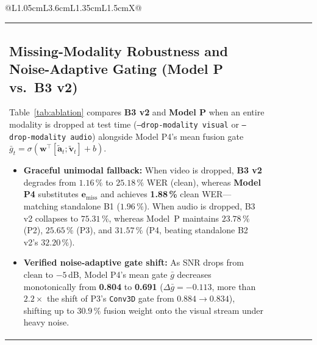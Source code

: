 \documentclass[11pt,a4paper]{article}
\newcommand{\code}[1]{\texttt{\small #1}}
\begin{document}
\begin{table}[htbp]
\begin{tabularx}{\textwidth}{@{}L{1.05cm}L{3.6cm}L{1.35cm}L{1.5cm}X@{}}
\begin{table}[htbp]
\begin{tabularx}{\textwidth}{@{}lccccc@{}}
\subsection{Missing-Modality Robustness and Noise-Adaptive Gating (Model P vs.\ B3 v2)}
Table~\ref{tab:ablation} compares \textbf{B3 v2} and \textbf{Model P} when an entire modality is dropped at test time (\code{--drop-modality visual} or \code{--drop-modality audio}) alongside Model P4's mean fusion gate $\bar{g}_t = \sigma(\mathbf{w}^\top [\tilde{\mathbf{a}}_t; \tilde{\mathbf{v}}_t] + b)$.
\begin{itemize}
  \item \textbf{Graceful unimodal fallback:} When video is dropped, \textbf{B3 v2} degrades from $1.16\,\%$ to $25.18\,\%$ WER (clean), whereas \textbf{Model P4} substitutes $\mathbf{e}_{\text{miss}}$ and achieves \textbf{1.88\,\%} clean WER---matching standalone B1 ($1.96\,\%$). When audio is dropped, B3 v2 collapses to $75.31\,\%$, whereas Model~P maintains $23.78\,\%$ (P2), $25.65\,\%$ (P3), and $31.57\,\%$ (P4, beating standalone B2 v2's $32.20\,\%$).
  \item \textbf{Verified noise-adaptive gate shift:} As SNR drops from $\text{clean}$ to $-5$\,dB, Model P4's mean gate $\bar{g}$ decreases monotonically from \textbf{0.804} to \textbf{0.691} ($\Delta\bar{g} = -0.113$, more than $2.2{\times}$ the shift of P3's \code{Conv3D} gate from $0.884 \to 0.834$), shifting up to $30.9\,\%$ fusion weight onto the visual stream under heavy noise.
\end{itemize}


\end{tabularx}
\end{table}
\end{tabularx}
\end{table}
\end{document}
